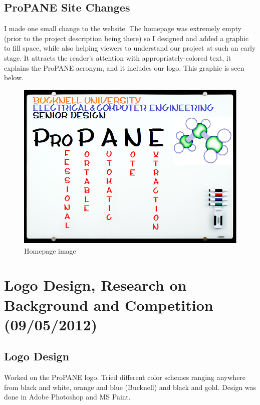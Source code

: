 \documentclass[]{article}
\begin{document}
		\subsection*{ProPANE Site Changes}
		I made one small change to the website.  The homepage was extremely empty (prior to the project description being there) so I designed and added a graphic to fill space, while also helping viewers to understand our project at such an early stage.  It attracts the reader's attention with appropriately-colored text, it explains the ProPANE acronym, and it includes our logo.  This graphic is seen below.

\begin{figure}[H]
\centering
\includegraphics[scale=0.36]{images/propane_whiteboard}
\caption{Homepage image}
\end{figure}
 

	\section{Logo Design, Research on Background and Competition  (09/05/2012)}

		\subsection*{Logo Design}
		Worked on the ProPANE logo.  Tried different color schemes ranging anywhere from black and white, orange and blue (Bucknell) and black and gold.  Design was done in Adobe Photoshop and MS Paint.
\end{document}
